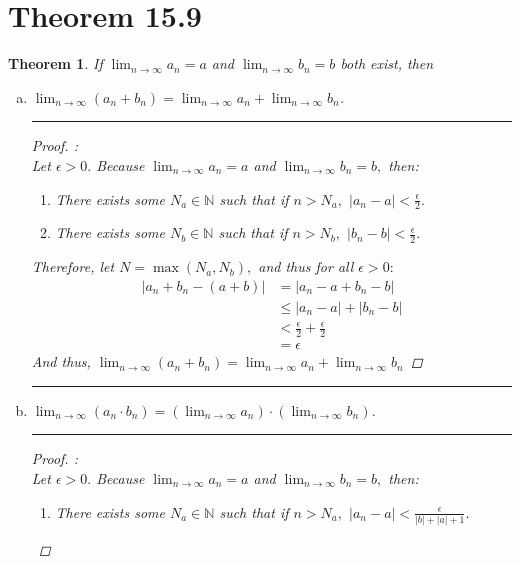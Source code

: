 \documentclass[openany, amssymb, psamsfonts]{amsart}
\newcommand{\bbN}{\mathbb{N}}
\newtheorem{thm}{Theorem}[section]
\theoremstyle{definition}
\numberwithin{equation}{section}
\begin{document}
\section*{Theorem 15.9}
\begin{thm}
\label{15.9}
	If $\displaystyle \lim_{n\to \infty}a_n=a$ and $\displaystyle \lim_{n\to\infty} b_n=b$ both exist, then 
	\begin{enumerate}[(a)]
		\item \quad $\displaystyle\lim_{n\to \infty}(a_n+b_n) = \lim_{n\to\infty} a_n+\lim_{n\to\infty} b_n$.
  \vspace{4pt}     \hrule   \vspace{4pt}\begin{proof}:\\
  Let $\epsilon>0.$ Because $\lim_{n\to \infty} a_n = a$ and $\lim_{n\to \infty}b_n = b,$ then:
  \begin{enumerate}
  \item There exists some $N_a \in \bbN$ such that if $n>N_a,$ $|a_n - a|< \frac{\epsilon}{2}.$
  \item There exists some $N_b \in \bbN$ such that if $n>N_b,$ $|b_n - b|< \frac{\epsilon}{2}.$
  \end{enumerate}
  Therefore, let $N = \max(N_a, N_b),$ and thus for all $\epsilon>0:$
  \begin{align*}
  |a_n + b_n  - (a+b)|&= |a_n - a + b_n - b|\\
  &\leq |a_n - a| + |b_n - b|\\
  &<\frac{\epsilon}{2} + \frac{\epsilon}{2}\\
  &= \epsilon
  \end{align*}
  And thus, $\lim_{n\to \infty}(a_n + b_n) = \lim_{n\to \infty}a_n + \lim_{n\to \infty}b_n$
  \end{proof} \vspace{4pt}     \hrule   \vspace{4pt}
		\item \quad $\displaystyle\lim_{n\to \infty} (a_n\cdot b_n)  =  \left( \lim_{n\to \infty} a_n \right)\cdot \left(\lim_{n\to \infty} b_n \right)$.
 \vspace{4pt}     \hrule   \vspace{4pt} \begin{proof}:\\
  Let $\epsilon>0.$ Because $\lim_{n\to \infty} a_n = a$ and $\lim_{n\to \infty}b_n = b,$ then:
  \begin{enumerate}
  \item There exists some $N_a \in \bbN$ such that if $n>N_a,$ $|a_n - a|< \frac{\epsilon}{|b| + |a|+1}.$

\end{enumerate}
\end{proof}
\end{enumerate}
\end{thm}
\end{document}
